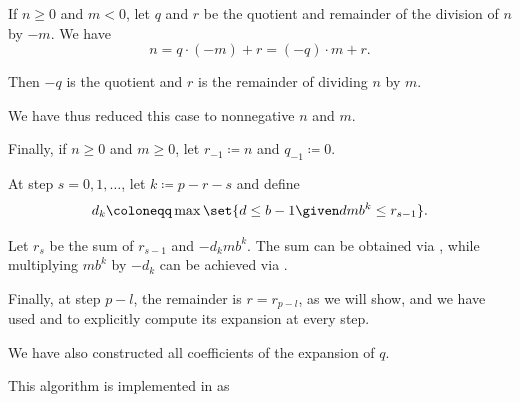\begin{algorithm}
\begin{thmenum}
     If \( n \geq 0 \) and \( m < 0 \), let \( q \) and \( r \) be the quotient and remainder of the division of \( n \) by \( -m \). We have
    \begin{equation*}
      n = q \cdot (-m) + r = (-q) \cdot m + r.
    \end{equation*}

    Then \( -q \) is the quotient and \( r \) is the remainder of dividing \( n \) by \( m \).

    We have thus reduced this case to nonnegative \( n \) and \( m \).

     Finally, if \( n \geq 0 \) and \( m \geq 0 \), let \( r_{-1} \coloneqq n \) and \( q_{-1} \coloneqq 0 \).

     At step \( s = 0, 1, \ldots \), let \( k \coloneqq p - r - s \) and define
    \begin{equation*}
      d_k \coloneqq \max\set{ d \leq b - 1 \given d m b^k \leq r_{s - 1} }.
    \end{equation*}

    Let \( r_s \) be the sum of \( r_{s - 1} \) and \( -d_k m b^k \). The sum can be obtained via , while multiplying \( m b^k \) by \( -d_k \) can be achieved via .

     Finally, at step \( p - l \), the remainder is \( r = r_{p - l} \), as we will show, and we have used  and  to explicitly compute its expansion at every step.

    We have also constructed all coefficients of the expansion of \( q \).
  \end{thmenum}
\end{algorithm}
\begin{comments}
  \item This algorithm is implemented in \cite{notebook:code} as
  \begin{CodeRefDisplay}
  \end{CodeRefDisplay}
\end{comments}
